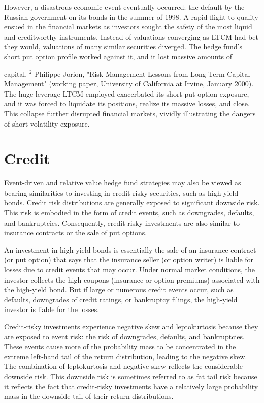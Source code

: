 \documentclass[11pt]{article}
\begin{document}
However, a disastrous economic event eventually occurred: the default by the Russian government on its bonds in the summer of 1998. A rapid flight to quality ensued in the financial markets as investors sought the safety of the most liquid and creditworthy instruments. Instead of valuations converging as LTCM had bet they would, valuations of many similar securities diverged. The hedge fund's short put option profile worked against it, and it lost massive amounts of

capital. ${ }^{2}$ Philippe Jorion, "Risk Management Lessons from Long-Term Capital Management" (working paper, University of California at Irvine, January 2000). The huge leverage LTCM employed exacerbated its short put option exposure, and it was forced to liquidate its positions, realize its massive losses, and close. This collapse further disrupted financial markets, vividly illustrating the dangers of short volatility exposure.

\section*{Credit}
Event-driven and relative value hedge fund strategies may also be viewed as bearing similarities to investing in credit-risky securities, such as high-yield bonds. Credit risk distributions are generally exposed to significant downside risk. This risk is embodied in the form of credit events, such as downgrades, defaults, and bankruptcies. Consequently, credit-risky investments are also similar to insurance contracts or the sale of put options.

An investment in high-yield bonds is essentially the sale of an insurance contract (or put option) that says that the insurance seller (or option writer) is liable for losses due to credit events that may occur. Under normal market conditions, the investor collects the high coupons (insurance or option premiums) associated with the high-yield bond. But if large or numerous credit events occur, such as defaults, downgrades of credit ratings, or bankruptcy filings, the high-yield investor is liable for the losses.

Credit-risky investments experience negative skew and leptokurtosis because they are exposed to event risk: the risk of downgrades, defaults, and bankruptcies. These events cause more of the probability mass to be concentrated in the extreme left-hand tail of the return distribution, leading to the negative skew. The combination of leptokurtosis and negative skew reflects the considerable downside risk. This downside risk is sometimes referred to as fat tail risk because it reflects the fact that credit-risky investments have a relatively large probability mass in the downside tail of their return distributions.
\end{document}

